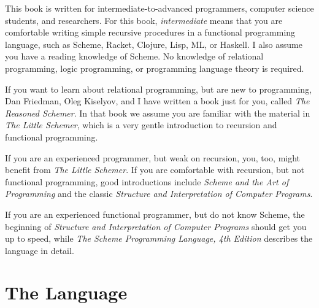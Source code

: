 This book is written for
intermediate-to-advanced programmers, computer science students, and
researchers.  For this book, \emph{intermediate} means that you are
comfortable writing simple recursive procedures in a functional
programming language, such as Scheme, Racket, Clojure, Lisp, ML, or
Haskell.  I also assume you have a reading knowledge of Scheme.
%
No knowledge of relational programming, logic programming, or programming
language theory is required.

If you want to learn about relational programming, but are new to
programming, Dan Friedman, Oleg Kiselyov, and I have written a book just for you, called
\emph{The Reasoned Schemer}\cite{trs}. In that book we assume you are familiar with the material in \emph{The Little
  Schemer}\cite{Friedman:1996:LS:230223}, which is a very gentle introduction to recursion and
functional programming.

If you are an experienced programmer, but weak on recursion, you, too, might
benefit from \emph{The Little Schemer}.  If you are comfortable with
recursion, but not functional programming, good introductions include
\emph{Scheme and the Art of Programming}\cite{Springer:1989:Art} and
the classic \emph{Structure and Interpretation of Computer
  Programs}\cite{Abelson:1996:SIC:547755}.


If you are an experienced functional programmer, but do not know
Scheme, the beginning of \emph{Structure and Interpretation of
  Computer Programs} should get you up to speed, while \emph{The
  Scheme Programming Language, 4th Edition}\cite{Dybvig:2009:SPL:1618542} describes the language in detail.


\section{The Language}\label{sec:preface:language}

